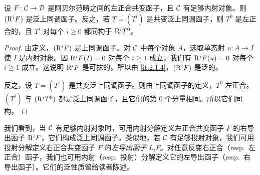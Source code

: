 \begin{proposition}\label{it:2.1.5}
设 $F\colon\mathcal{C}\to\mathcal{D}$ 是阿贝尔范畴之间的左正合共变函子，且 $\mathcal{C}$ 有足够内射对象。则 $(\mathrm{R}^iF)$ 是泛上同调函子。反之，若 $T=(T^i)$ 是共变泛上同调函子，则 $T^0$ 是左正合的，且 $T^i$ 对每个 $i\ge0$ 都同构于 $\mathrm{R}^iT^0$。
\end{proposition}
\begin{proof}
由定义，$(\mathrm{R}^iF)$ 是上同调函子。对 $\mathcal{C}$ 中每个对象 $A$，选取单态射 $u\colon A\to I$ 使 $I$ 是内射对象。因 $\mathrm{R}^iF(I)=0$ 对每个 $i\ge1$ 成立，我们有 $\mathrm{R}^iF(u)=0$ 对每个 $i\ge1$ 成立。这说明 $\mathrm{R}^iF$ 是可抹的。所以由 \ref{it:2.1.4}，$(\mathrm{R}^iF)$ 是泛的。

反之，设 $T=(T^i)$ 是共变泛上同调函子。则由上同调函子的定义，$T^0$ 左正合。$(T^i)$ 与 $(\mathrm{R}^iT^0)$ 都是泛上同调函子，且它们的第 $0$ 个分量相同。所以它们同构。
\end{proof}

我们看到，当 $\mathcal{C}$ 有足够内射对象时，可用内射分解定义左正合共变函子 $F$ 的右导出函子 $\mathrm{R}^iF$，它们构成泛上同调函子。类似地，若 $\mathcal{C}$ 有足够投射对象，我们可用投射分解定义右正合共变函子 $F$ 的\emph{左导出函子} $L_iF$。对任意反变右正合（resp.\ 左正合）函子，我们也可用内射（resp.\ 投射）分解定义它的左导出函子（resp.\ 右导出函子）。它们的泛性质留给读者陈述。

